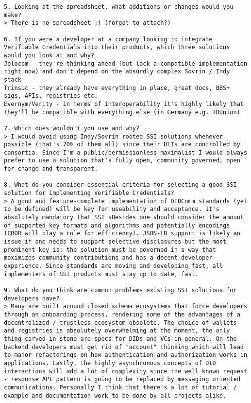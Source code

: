 \begin{Verbatim}[breaklines=true, breaksymbol={}, breaksymbolsepleftnchars=2]
5. Looking at the spreadsheet, what additions or changes would you make?
> There is no spreadsheet ;) (forgot to attach?)

6. If you were a developer at a company looking to integrate Verifiable Credentials into their products, which three solutions would you look at and why?
Jolocom - they're thinking ahead (but lack a compatible implementation right now) and don't depend on the absurdly complex Sovrin / Indy stack
Trinsic - they already have everything in place, great docs, BBS+ sigs, APIs, registries etc.
Evernym/Verity - in terms of interoperability it's highly likely that they'll be compatible with everything else (in Germany e.g. IDUnion)

7. Which ones wouldn't you use and why?
> I would avoid using Indy/Sovrin rooted SSI solutions whenever possible (that's 70% of them all) since their DLTs are controlled by consortia. Since I'm a public/permissionless maximalist I would always prefer to use a solution that's fully open, community governed, open for change and transparent.

8. What do you consider essential criteria for selecting a good SSI solution for implementing Verifiable Credentials?
> A good and feature-complete implementation of DIDComm standards (yet to be defined) will be key for useability and acceptance. It's absolutely mandatory that SSI sBesides one should consider the amount of supported key formats and algorithms and potentially encodings (CBOR will play a role for efficiency). JSON-LD support is likely an issue if one needs to support selective disclosures but the most prominent key is: the solution must be governed in a way that maximizes community contributions and has a decent developer experience. Since standards are moving and developing fast, all implementers of SSI products must stay up to date, fast.

9. What do you think are common problems existing SSI solutions for developers have?
> Many are built around closed schema ecosystems that force developers through an onboarding process, rendering some of the advantages of a decentralized / trustless ecosystem obsolete. The choice of wallets and registries is absolutely overwhelming at the moment, the only thing carved in stone are specs for DIDs and VCs in general. On the backend developers must get rid of "account" thinking which will lead to major refactorings on how authentication and authorization works in applications. Lastly, the highly asynchronous concepts of DID interactions will add a lot of complexity since the well known request - response API pattern is going to be replaced by messaging oriented communications. Personally I think that there's a lot of tutorial / example and documentation work to be done by all projects alike.


\end{Verbatim}
